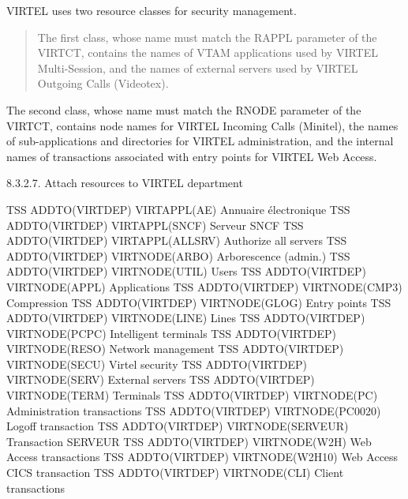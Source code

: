\documentclass[letterpaper,10pt,english]{sphinxmanual}
\begin{document}

VIRTEL uses two resource classes for security management.
\begin{quote}

The first class, whose name must match the RAPPL parameter of the VIRTCT, contains the names of VTAM applications used by VIRTEL Multi-Session, and the names of external servers used by VIRTEL Outgoing Calls (Videotex).
\end{quote}

The second class, whose name must match the RNODE parameter of the  VIRTCT, contains node names for VIRTEL Incoming Calls (Minitel), the names of sub-applications and directories for VIRTEL administration, and the internal names of transactions associated with entry points for VIRTEL Web Access.

8.3.2.7. Attach resources to VIRTEL department

\begin{sphinxVerbatim}[commandchars=\\\{\}]
TSS ADDTO(VIRTDEP) VIRTAPPL(AE) Annuaire électronique
TSS ADDTO(VIRTDEP) VIRTAPPL(SNCF) Serveur SNCF
TSS ADDTO(VIRTDEP) VIRTAPPL(\PYGZdl{}\PYGZdl{}ALLSRV) Authorize all servers
TSS ADDTO(VIRTDEP) VIRTNODE(\PYGZdl{}\PYGZdl{}ARBO\PYGZdl{}\PYGZdl{}) Arborescence (admin.)
TSS ADDTO(VIRTDEP) VIRTNODE(\PYGZdl{}\PYGZdl{}UTIL\PYGZdl{}\PYGZdl{}) Users
TSS ADDTO(VIRTDEP) VIRTNODE(\PYGZdl{}\PYGZdl{}APPL\PYGZdl{}\PYGZdl{}) Applications
TSS ADDTO(VIRTDEP) VIRTNODE(\PYGZdl{}\PYGZdl{}CMP3\PYGZdl{}\PYGZdl{}) Compression
TSS ADDTO(VIRTDEP) VIRTNODE(\PYGZdl{}\PYGZdl{}GLOG\PYGZdl{}\PYGZdl{}) Entry points
TSS ADDTO(VIRTDEP) VIRTNODE(\PYGZdl{}\PYGZdl{}LINE\PYGZdl{}\PYGZdl{}) Lines
TSS ADDTO(VIRTDEP) VIRTNODE(\PYGZdl{}\PYGZdl{}PCPC\PYGZdl{}\PYGZdl{}) Intelligent terminals
TSS ADDTO(VIRTDEP) VIRTNODE(\PYGZdl{}\PYGZdl{}RESO\PYGZdl{}\PYGZdl{}) Network management
TSS ADDTO(VIRTDEP) VIRTNODE(\PYGZdl{}\PYGZdl{}SECU\PYGZdl{}\PYGZdl{}) Virtel security
TSS ADDTO(VIRTDEP) VIRTNODE(\PYGZdl{}\PYGZdl{}SERV\PYGZdl{}\PYGZdl{}) External servers
TSS ADDTO(VIRTDEP) VIRTNODE(\PYGZdl{}\PYGZdl{}TERM\PYGZdl{}\PYGZdl{}) Terminals
TSS ADDTO(VIRTDEP) VIRTNODE(PC) Administration transactions
TSS ADDTO(VIRTDEP) VIRTNODE(PC\PYGZhy{}0020) Logoff transaction
TSS ADDTO(VIRTDEP) VIRTNODE(SERVEUR) Transaction SERVEUR
TSS ADDTO(VIRTDEP) VIRTNODE(W2H) Web Access transactions
TSS ADDTO(VIRTDEP) VIRTNODE(W2H\PYGZhy{}10) Web Access CICS transaction
TSS ADDTO(VIRTDEP) VIRTNODE(CLI) Client transactions
\end{sphinxVerbatim}
\end{document}
